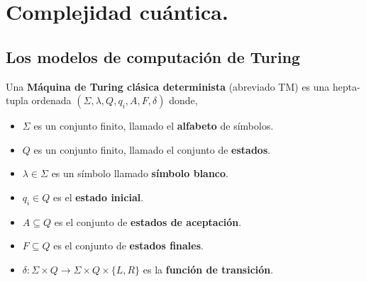 \chapter{Complejidad cuántica.}\label{Comp1}


\section{Los modelos de computación de Turing}

\begin{defin}
Una \textbf{Máquina de Turing clásica determinista} (abreviado TM) es una hepta-tupla ordenada $(\Sigma, \lambda, Q, q_i, A, F, \delta)$ donde,

\begin{itemize}
\item $\Sigma$ es un conjunto finito, llamado el \textbf{alfabeto} de símbolos.
\item $Q$ es un conjunto finito, llamado el conjunto de \textbf{estados}.
\item $\lambda\in \Sigma$ es un símbolo llamado \textbf{símbolo blanco}.
\item $q_i\in Q$ es el \textbf{estado inicial}.
\item $A\subseteq Q$ es el conjunto de \textbf{estados de aceptación}.
\item $F\subseteq Q$ es el conjunto de \textbf{estados finales}.
\item $\delta: \Sigma \times Q \rightarrow \Sigma \times Q \times \{L,R\}$ es la \textbf{función de transición}.
\end{itemize}
\end{defin}

